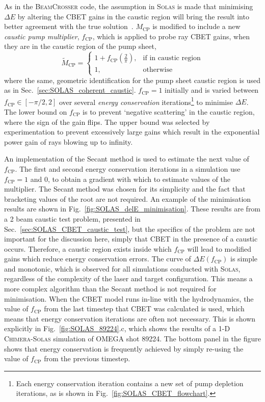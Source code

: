 As in the \textsc{BeamCrosser} code, the assumption in \textsc{Solas} is made that minimising $\Delta E$ by altering the \ac{CBET} gains in the caustic region will bring the result into better agreement with the true solution~\cite{follett_validation_2022}.
$M_{\text{CP}}$ is modified to include a new \textit{caustic pump multiplier}, $f_{\text{CP}}$, which is applied to probe ray \ac{CBET} gains, when they are in the caustic region of the pump sheet,
\begin{equation}
    \label{eq:modified_MCP}
    \tilde{M}_{\text{CP}}= 
\begin{cases}
    1 + f_{\text{CP}} \left( \frac{2}{\pi} \right),& \text{if in caustic region}\\
    1,              & \text{otherwise}
\end{cases}
\end{equation}
where the same, geometric identification for the pump sheet caustic region is used as in Sec.~\ref{sec:SOLAS_coherent_caustic}.
$f_{\text{CP}}=1$ initially and is varied between $f_{\text{CP}}\in [-\pi/2,2]$ over several \textit{energy conservation} iterations\footnote{Each energy conservation iteration contains a new set of pump depletion iterations, as is shown in Fig.~\ref{fig:SOLAS_CBET_flowchart}.} to minimise $\Delta E$.
The lower bound on $f_{\text{CP}}$ is to prevent `negative scattering' in the caustic region, where the sign of the gain flips.
The upper bound was selected by experimentation to prevent excessively large gains which result in the exponential power gain of rays blowing up to infinity.

An implementation of the Secant method is used to estimate the next value of $f_{\text{CP}}$.
The first and second energy conservation iterations in a simulation use $f_{\text{CP}}=1$ and $0$, to obtain a gradient with which to estimate values of the multiplier.
The Secant method was chosen for its simplicity and the fact that bracketing values of the root are not required.
An example of the minimisation results are shown in Fig.~\ref{fig:SOLAS_delE_minimisation}.
These results are from a 2 beam caustic test problem, presented in Sec.~\ref{sec:SOLAS_CBET_caustic_test}, but the specifics of the problem are not important for the discussion here, simply that \ac{CBET} in the presence of a caustic occurs.
Therefore, a caustic region exists inside which $f_{\text{CP}}$ will lead to modified gains which reduce energy conservation errors.
The curve of $\Delta E(f_{\text{CP}})$ is simple and monotonic, which is observed for all simulations conducted with \textsc{Solas}, regardless of the complexity of the laser and target configuration.
This means a more complex algorithm than the Secant method is not required for minimisation.
When the \ac{CBET} model runs in-line with the hydrodynamics, the value of $f_{\text{CP}}$ from the last timestep that \ac{CBET} was calculated is used, which means that energy conservation iterations are often not necessary.
This is shown explicitly in Fig.~\ref{fig:SOLAS_89224}.c, which shows the results of a 1-D \textsc{Chimera}-\textsc{Solas} simulation of OMEGA shot 89224.
The bottom panel in the figure shows that energy conservation is frequently achieved by simply re-using the value of $f_{\text{CP}}$ from the previous timestep.

